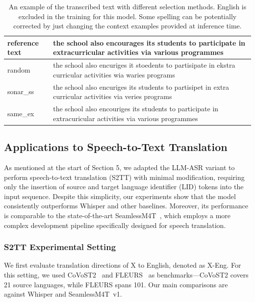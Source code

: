 \documentclass[]{fairmeta}
\begin{document}
\begin{table}[!ht]
    \centering
    \begin{tabular}{|l|p{35em}|}
    \hline
        reference text & the school also encourages its students to participate in extracurricular activities via various programmes \\ \hline
        random & the school also encuriges it stoedents to partisipate in ekstra curricular activities wia waries programs \\ \hline
        sonar\_ss & the school also encuriges its students to partisipet in extra curricular activities via veries programs \\ \hline
        same\_ex & the school also encouriges its students to participate in extracuricular activities via various programmes \\
    \hline
    \end{tabular}
    \caption{An example of the transcribed text with different selection methods. English is excluded in the training for this model. Some spelling can be potentially corrected by just changing the context examples provided at inference time. 
    }
    \label{tab:example_eng}
\end{table}

\subsection{Applications to Speech-to-Text Translation}
\label{sec:s2tt_results}

As mentioned at the start of Section 5, we adapted the LLM-ASR variant to perform speech-to-text translation (S2TT) with minimal modification, requiring only the insertion of source and target language identifier (LID) tokens into the input sequence. Despite this simplicity, our experiments show that the model consistently outperforms Whisper and other baselines. Moreover, its performance is comparable to the state-of-the-art SeamlessM4T~\citep{SEAMLESS2025}, which employs a more complex development pipeline specifically designed for speech translation.

\subsubsection{S2TT Experimental Setting}
We first evaluate translation directions of X to English, denoted as X-Eng. For this setting, we used CoVoST2~\citep{wang2020covost} and FLEURS~\citep{conneau2023fleurs} as benchmarks—CoVoST2 covers 21 source languages, while FLEURS spans 101. Our main comparisons are against Whisper and SeamlessM4T~v1.
\end{document}
